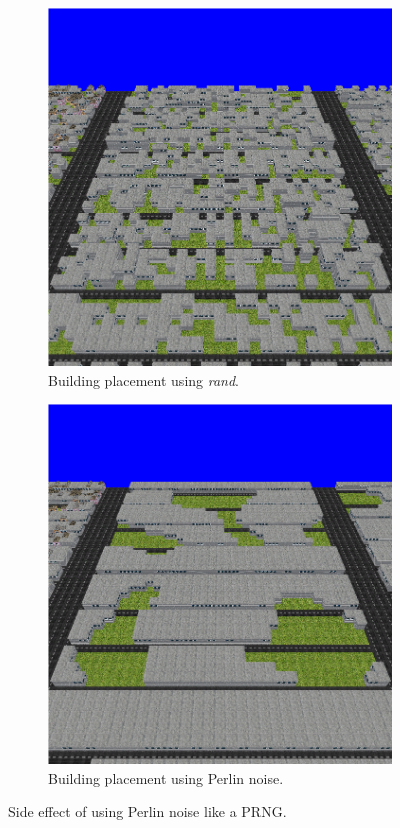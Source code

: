 	\begin{figure}[h]
		\centering
		\begin{subfigure}{0.35\textwidth}
			\centering
			\includegraphics[width=0.9\linewidth]{"Images/rand vacant"}
			\caption{Building placement using \textit{rand}.}
			\label{fig:rand-vacant}
		\end{subfigure}
		\begin{subfigure}{0.35\textwidth}
			\centering
			\includegraphics[width=0.9\linewidth]{"Images/perlin vacant"}
			\caption{Building placement using Perlin noise.}
			\label{fig:perlin-vacant}
		\end{subfigure}
		\caption{Side effect of using Perlin noise like a PRNG.}
		\label{fig:perlin-rand-vacant}
	\end{figure}
	
